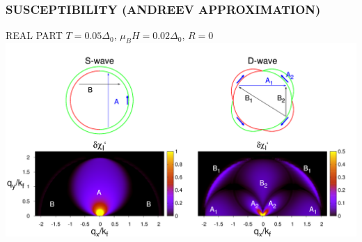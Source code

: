 \documentclass[amssymb,amsmath]{beamer}
\begin{document}
\begin{frame}
\frametitle{SUSCEPTIBILITY \small{(ANDREEV APPROXIMATION)}}
{\huge REAL PART} $T=0.05\Delta_0$, $\mu_B H = 0.02\Delta_0$, $R=0$
\includegraphics[scale=0.12]{./figures_3/fig2_SD_andreev/Fig2_andreev.png}

\end{frame}
\end{document}
